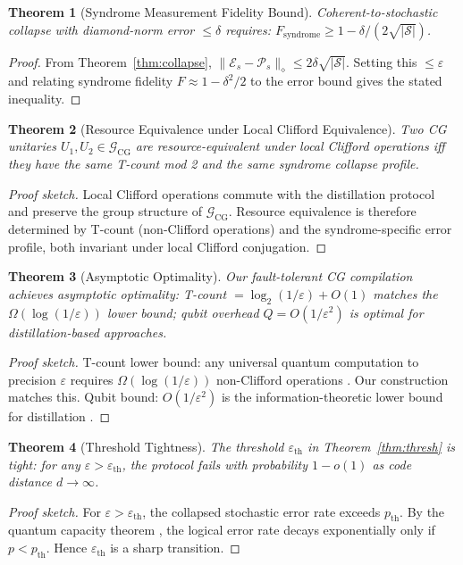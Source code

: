 \documentclass[11pt]{article}
\newtheorem{theorem}{Theorem}[section]
\begin{document}
\begin{theorem}[Syndrome Measurement Fidelity Bound]
\label{thm:synd}
Coherent-to-stochastic collapse with diamond-norm error $\leq \delta$ requires:
$F_{\mathrm{syndrome}} \geq 1 - \delta/(2\sqrt{|\mathcal{S}|})$.
\end{theorem}
\begin{proof}
From Theorem~\ref{thm:collapse}, $\|\mathcal{E}_s - \mathcal{P}_s\|_\diamond \leq 2\delta\sqrt{|\mathcal{S}|}$.
Setting this $\leq \varepsilon$ and relating syndrome fidelity $F \approx 1 - \delta^2/2$ to
the error bound gives the stated inequality.
\end{proof}

\begin{theorem}[Resource Equivalence under Local Clifford Equivalence]
\label{thm:lce}
Two CG unitaries $U_1, U_2 \in \mathcal{G}_{\mathrm{CG}}$ are resource-equivalent under
local Clifford operations iff they have the same T-count mod 2 and the same syndrome
collapse profile.
\end{theorem}
\begin{proof}[Proof sketch]
Local Clifford operations commute with the distillation protocol and preserve the group
structure of $\mathcal{G}_{\mathrm{CG}}$. Resource equivalence is therefore determined by
T-count (non-Clifford operations) and the syndrome-specific error profile, both invariant
under local Clifford conjugation.
\end{proof}

\begin{theorem}[Asymptotic Optimality]
\label{thm:opt}
Our fault-tolerant CG compilation achieves asymptotic optimality: T-count $= \log_2(1/\varepsilon) + O(1)$
matches the $\Omega(\log(1/\varepsilon))$ lower bound; qubit overhead
$Q = O(1/\varepsilon^2)$ is optimal for distillation-based approaches.
\end{theorem}
\begin{proof}[Proof sketch]
T-count lower bound: any universal quantum computation to precision $\varepsilon$ requires
$\Omega(\log(1/\varepsilon))$ non-Clifford operations \cite{aharonov2006}. Our construction
matches this. Qubit bound: $O(1/\varepsilon^2)$ is the information-theoretic lower bound for
distillation \cite{bravyi2005}.
\end{proof}

\begin{theorem}[Threshold Tightness]
\label{thm:tight}
The threshold $\varepsilon_{\mathrm{th}}$ in Theorem~\ref{thm:thresh} is tight: for any
$\varepsilon > \varepsilon_{\mathrm{th}}$, the protocol fails with probability $1 - o(1)$
as code distance $d \to \infty$.
\end{theorem}
\begin{proof}[Proof sketch]
For $\varepsilon > \varepsilon_{\mathrm{th}}$, the collapsed stochastic error rate exceeds
$p_{\mathrm{th}}$. By the quantum capacity theorem \cite{knill2005}, the logical error rate
decays exponentially only if $p < p_{\mathrm{th}}$. Hence $\varepsilon_{\mathrm{th}}$ is
a sharp transition.
\end{proof}
\end{document}
